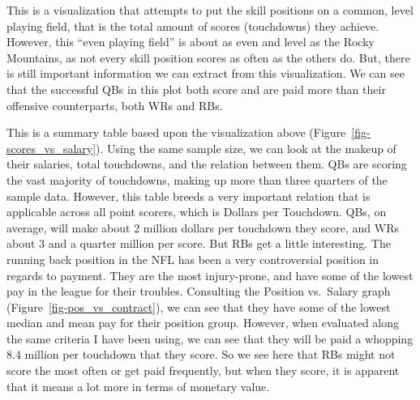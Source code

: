 \documentclass[
  letterpaper,
  DIV=11,
  numbers=noendperiod]{scrartcl}
\begin{document}
This is a visualization that attempts to put the skill positions on a
common, level playing field, that is the total amount of scores
(touchdowns) they achieve. However, this ``even playing field'' is about
as even and level as the Rocky Mountains, as not every skill position
scores as often as the others do. But, there is still important
information we can extract from this visualization. We can see that the
successful QBs in this plot both score and are paid more than their
offensive counterparts, both WRs and RBs.

\begin{table}[H]

\caption{\label{tbl-dollar_per_score}Dollar Per Score By Skill Position}


\end{table}%

This is a summary table based upon the visualization above
(Figure~\ref{fig-scores_vs_salary}). Using the same sample size, we can
look at the makeup of their salaries, total touchdowns, and the relation
between them. QBs are scoring the vast majority of touchdowns, making up
more than three quarters of the sample data. However, this table breeds
a very important relation that is applicable across all point scorers,
which is Dollars per Touchdown. QBs, on average, will make about 2
million dollars per touchdown they score, and WRs about 3 and a quarter
million per score. But RBs get a little interesting. The running back
position in the NFL has been a very controversial position in regards to
payment. They are the most injury-prone, and have some of the lowest pay
in the league for their troubles. Consulting the Position vs.~Salary
graph (Figure~\ref{fig-pos_vs_contract}), we can see that they have some
of the lowest median and mean pay for their position group. However,
when evaluated along the same criteria I have been using, we can see
that they will be paid a whopping 8.4 million per touchdown that they
score. So we see here that RBs might not score the most often or get
paid frequently, but when they score, it is apparent that it means a lot
more in terms of monetary value.
\end{document}
